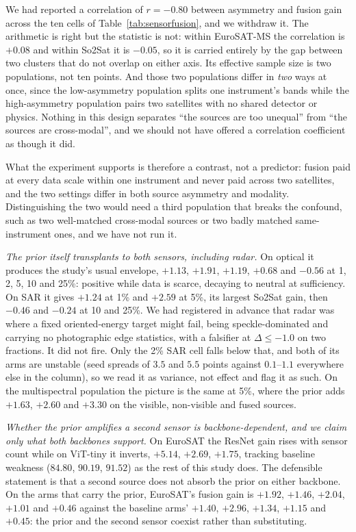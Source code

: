 We had reported a correlation of $r = -0.80$ between asymmetry and fusion
gain across the ten cells of Table~\ref{tab:sensorfusion}, and we withdraw
it. The arithmetic is right but the statistic is not: within EuroSAT-MS the
correlation is $+0.08$ and within So2Sat it is $-0.05$, so it is carried
entirely by the gap between two clusters that do not overlap on either
axis. Its effective sample size is two populations, not ten points. And
those two populations differ in \emph{two} ways at once, since the
low-asymmetry population splits one instrument's bands while the
high-asymmetry population pairs two satellites with no shared detector or
physics. Nothing in this design separates ``the sources are too unequal''
from ``the sources are cross-modal'', and we should not have offered a
correlation coefficient as though it did.

What the experiment supports is therefore a contrast, not a predictor:
fusion paid at every data scale within one instrument and never paid across
two satellites, and the two settings differ in both source asymmetry and
modality. Distinguishing the two would need a third population that breaks
the confound, such as two well-matched cross-modal sources or two badly
matched same-instrument ones, and we have not run it.

\emph{The prior itself transplants to both sensors, including radar.}  On
optical it produces the study's usual envelope, $+1.13$, $+1.91$, $+1.19$,
$+0.68$ and $-0.56$ at 1, 2, 5, 10 and 25\%: positive while data is scarce,
decaying to neutral at sufficiency. On SAR it gives $+1.24$ at 1\% and
$+2.59$ at 5\%, its largest So2Sat gain, then $-0.46$ and $-0.24$ at 10 and
25\%. We had registered in advance that radar was where a fixed
oriented-energy target might fail, being speckle-dominated and carrying no
photographic edge statistics, with a falsifier at $\Delta \le -1.0$ on two
fractions. It did not fire. Only the 2\% SAR cell falls below that, and
both of its arms are unstable (seed spreads of $3.5$ and $5.5$ points
against $0.1$--$1.1$ everywhere else in the column), so we read it as variance, not effect and flag it as such. On the multispectral
population the picture is the same at 5\%, where the prior adds $+1.63$,
$+2.60$ and $+3.30$ on the visible, non-visible and fused sources.

\emph{Whether the prior amplifies a second sensor is
backbone-dependent, and we claim only what both backbones support.} On
EuroSAT the ResNet gain rises with sensor count while on ViT-tiny it
inverts, $+5.14$, $+2.69$, $+1.75$, tracking baseline weakness ($84.80$,
$90.19$, $91.52$) as the rest of this study does. The defensible statement
is that a second source does not absorb the prior on either backbone. On
the arms that carry the prior, EuroSAT's fusion gain is $+1.92$, $+1.46$,
$+2.04$, $+1.01$ and $+0.46$ against the baseline arms' $+1.40$, $+2.96$,
$+1.34$, $+1.15$ and $+0.45$: the prior and the second sensor coexist
rather than substituting.

